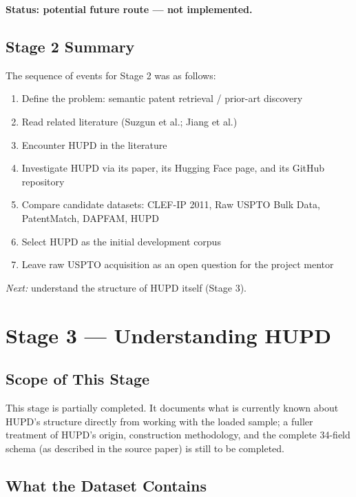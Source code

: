 \documentclass[11pt]{article}
\begin{document}
\noindent \textbf{Status: potential future route --- not implemented.}

\subsection{Stage 2 Summary}

The sequence of events for Stage 2 was as follows:

\begin{enumerate}
    \item Define the problem: semantic patent retrieval / prior-art discovery
    \item Read related literature (Suzgun et al.; Jiang et al.)
    \item Encounter HUPD in the literature
    \item Investigate HUPD via its paper, its Hugging Face page, and its GitHub repository
    \item Compare candidate datasets: CLEF-IP 2011, Raw USPTO Bulk Data, PatentMatch, DAPFAM, HUPD
    \item Select HUPD as the initial development corpus
    \item Leave raw USPTO acquisition as an open question for the project mentor
\end{enumerate}

\noindent \textit{Next:} understand the structure of HUPD itself (Stage 3).

\section{Stage 3 --- Understanding HUPD}

\subsection{Scope of This Stage}

This stage is partially completed. It documents what is currently known about HUPD's structure directly from working with the loaded sample; a fuller treatment of HUPD's origin, construction methodology, and the complete 34-field schema (as described in the source paper) is still to be completed.

\subsection{What the Dataset Contains}
\end{document}
